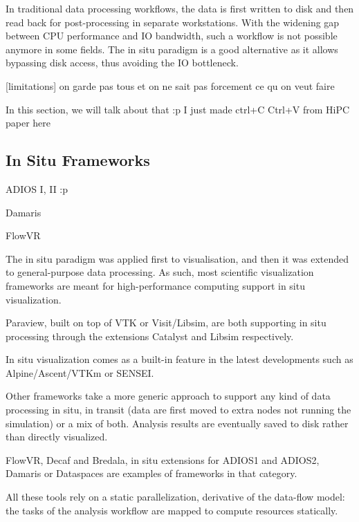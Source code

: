 In traditional data processing workflows, the data is first written to disk and then read back for post-processing in separate workstations. With the widening gap between CPU performance and IO bandwidth, such a workflow is not possible anymore in some fields. The in situ paradigm is a good alternative as it allows bypassing disk access, thus avoiding the IO bottleneck.  

[limitations] on garde pas tous et on ne sait pas forcement ce qu on veut faire 


In this section, we will talk about that :p
I just made ctrl+C Ctrl+V from HiPC paper here 
\subsection{In Situ Frameworks}

ADIOS I, II :p 

Damaris 

FlowVR

The in situ paradigm was applied first to visualisation\cite{InSituLiuMa:2007}, and then it was extended to general-purpose data processing. As such, most scientific visualization frameworks are meant for high-performance computing support in situ visualization.

Paraview\cite{ahrens_paraview_2005}, built on top of VTK\cite{hanwell_visualization_2015_vtk} or Visit/Libsim\cite{childs_visit_nodate}, are both supporting in situ processing through the extensions Catalyst\cite{catalyst11} and Libsim\cite{libsim11} respectively.

In situ visualization comes as a built-in feature in the latest developments such as Alpine/Ascent/VTKm\cite{Larsen-alpine-isav17,moreland_vtk-m_2016} or SENSEI\cite{ayachit_sensei_2016}.

Other frameworks take a more generic approach to support any kind of data processing in situ, in transit (data are first moved to extra nodes not running the simulation) or a mix of both.
Analysis results are eventually saved to disk rather than directly visualized.

FlowVR\cite{dreher_flexible_2014}, 
Decaf\cite{dreher_decaf_2017} and Bredala\cite{dreher_bredala_2016}, 
in situ extensions for ADIOS1\cite{lofstead_insights_2013_adios,boyuka_transparent_2014_adios} and ADIOS2\cite{godoy_adios2_2020}, Damaris\cite{dorier_damaris_2012} or 
Dataspaces\cite{docan_dataspaces_2012} are examples of frameworks in that category.

All these tools rely on a static parallelization, derivative of the data-flow model: the tasks of the analysis workflow are mapped to compute resources statically.

